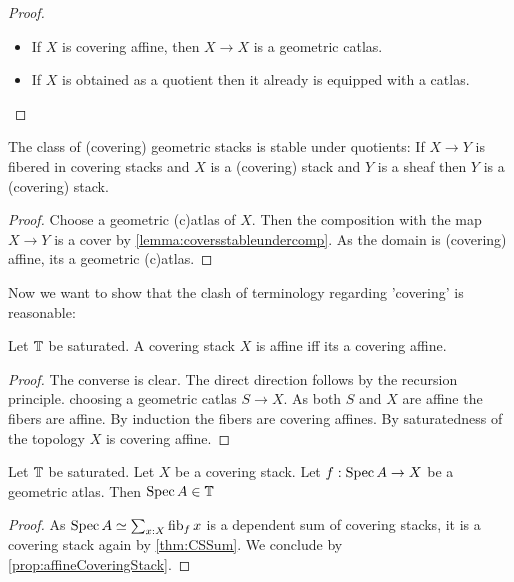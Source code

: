 \begin{proof}
	\begin{itemize}
		\item If 	$X$ is covering affine, then $X \to X$ is a geometric catlas. 
		\item If $X$ is obtained as a quotient then it already is equipped with a catlas. %
		
	\end{itemize}
\end{proof}
\begin{prop}{\label{prop:stackQuot}}
	The class of (covering) geometric stacks is stable under quotients: If $X \to Y$ is fibered in covering stacks and $X$ is a (covering) stack and $Y$ is a sheaf then $Y$ is a (covering) stack.
\end{prop}
\begin{proof}
	Choose a geometric (c)atlas of $X$. Then the composition with the map $X \to Y$ is a cover by \ref{lemma:coversstableundercomp}. As the domain is (covering) affine, its a geometric (c)atlas.
\end{proof}
Now we want to show that the clash of terminology regarding 'covering' is reasonable:


\begin{prop}{\label{prop:affineCoveringStack}}
	Let $\mathbb{T}$ be saturated.
	A covering stack $X$ is affine iff its a covering affine.
\end{prop}
\begin{proof}
	The converse is clear. The direct direction follows by the recursion principle. choosing a geometric catlas  $S \to X$. As both $S$ and $X$ are affine the fibers are affine. By induction the fibers are covering affines. By saturatedness of the topology $X$ is covering affine.
\end{proof}
\begin{lemma}{\label{lemma:atlasIsCatlas}}
	Let $\mathbb{T}$ be saturated. Let $X$ be a covering stack. Let $f : \operatorname{Spec} A \to X$ be a geometric atlas. Then $\operatorname{Spec} A \in \mathbb{T}$
\end{lemma}
\begin{proof}
	As $\operatorname{Spec} A \simeq \sum_{x : X} \operatorname{fib}_f x$ is a dependent sum of covering stacks, it is a covering stack again by \ref{thm:CSSum}. We conclude by \ref{prop:affineCoveringStack}.
\end{proof}	

